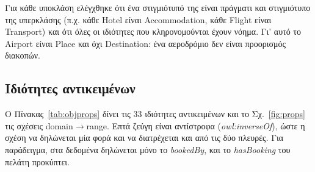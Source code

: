 \documentclass[conference]{IEEEtran}
\newcommand{\cls}[1]{\textsf{#1}}          %
\newcommand{\prop}[1]{\textit{#1}}         %
\begin{document}
Για κάθε υποκλάση ελέγχθηκε ότι ένα στιγμιότυπό της είναι πράγματι και στιγμιότυπο
της υπερκλάσης (π.χ. κάθε \cls{Hotel} είναι \cls{Accommodation}, κάθε
\cls{Flight} είναι \cls{Transport}) και ότι όλες οι ιδιότητες που κληρονομούνται
έχουν νόημα. Γι' αυτό το \cls{Airport} είναι \cls{Place} και όχι
\cls{Destination}: ένα αεροδρόμιο δεν είναι προορισμός διακοπών.

\subsection{Ιδιότητες αντικειμένων}

Ο Πίνακας~\ref{tab:objprops} δίνει τις 33 ιδιότητες αντικειμένων και το
Σχ.~\ref{fig:props} τις σχέσεις domain$\rightarrow$range. Επτά ζεύγη είναι
αντίστροφα (\prop{owl:inverseOf}), ώστε η σχέση να δηλώνεται μία φορά και να
διατρέχεται και από τις δύο πλευρές. Για παράδειγμα, στα δεδομένα δηλώνεται μόνο
το \prop{bookedBy}, και το \prop{hasBooking} του πελάτη προκύπτει.
\end{document}
